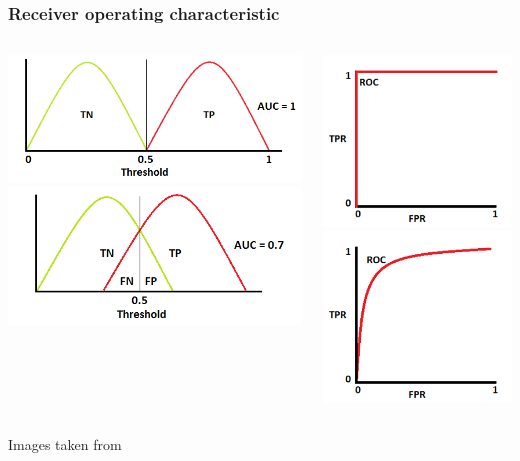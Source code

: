 \documentclass{beamer}
\begin{document}
\begin{frame}
\frametitle{Receiver operating characteristic}
\begin{columns}
\begin{center}
\includegraphics[width=1\linewidth]{Pic/ROC/ROC_A.png}
\includegraphics[width=1\linewidth]{Pic/ROC/ROC_B.png}\\
\end{center}
\begin{center}
\includegraphics[width=0.5\linewidth]{Pic/ROC/ROC_A_R.png}
\includegraphics[width=0.5\linewidth]{Pic/ROC/ROC_B_R.png}\\
\end{center}
\end{columns}
\begin{center}
Images taken from \cite{ROC_fig}
\end{center}
\end{frame}
\end{document}
